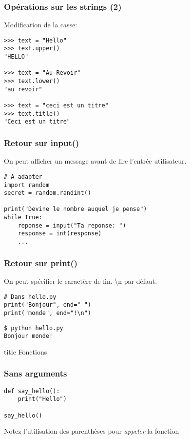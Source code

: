 \documentclass{beamer}
\begin{document}
\begin{frame}[fragile]
  \frametitle{Opérations sur les strings (2)}

Modification de la casse:

\begin{lstlisting}
>>> text = "Hello"
>>> text.upper()
"HELLO"

>>> text = "Au Revoir"
>>> text.lower()
"au revoir"

>>> text = "ceci est un titre"
>>> text.title()
"Ceci est un titre"
\end{lstlisting}

\end{frame}



\begin{frame}[fragile]
  \frametitle{Retour sur input()}
On peut afficher un message avant de lire l'entrée utilisateur.

\begin{lstlisting}
# A adapter
import random
secret = random.randint()

print("Devine le nombre auquel je pense")
while True:
    reponse = input("Ta reponse: ")
    response = int(response)
    ...
\end{lstlisting}


\end{frame}

\begin{frame}[fragile]
  \frametitle{Retour sur print()}

On peut spécifier le caractère de fin. \textbackslash n par défaut.

\begin{lstlisting}
# Dans hello.py
print("Bonjour", end=" ")
print("monde", end="!\n")
\end{lstlisting}

\begin{lstlisting}
$ python hello.py
Bonjour monde!
\end{lstlisting}

\end{frame}


\begin{frame}[fragile]
  \begin{beamercolorbox}[sep=8pt,center,shadow=true,rounded=true]{title}
    Fonctions
  \end{beamercolorbox}
\end{frame}


\begin{frame}[fragile]
  \frametitle{Sans arguments}

\begin{lstlisting}
def say_hello():
    print("Hello")

say_hello()
\end{lstlisting}

\vfill

Notez l'utilisation des parenthèses pour \emph{appeler} la fonction

\end{frame}
\end{document}
